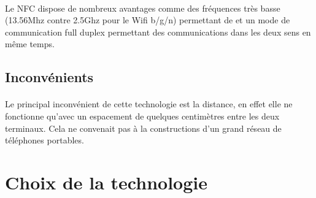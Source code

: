 \documentclass[a4paper,10pt]{report}
\begin{document}
    \paragraph{}
    Le NFC dispose de nombreux avantages comme des fréquences très basse (13.56Mhz contre 2.5Ghz pour le Wifi b/g/n) permettant de et un mode de communication full duplex permettant des communications dans les deux sens en même temps.
    \subsection{Inconvénients}
    \paragraph{}
    Le principal inconvénient de cette technologie est la distance, en effet elle ne fonctionne qu'avec un espacement de quelques centimètres entre les deux terminaux. Cela ne convenait pas à la constructions d'un grand réseau de téléphones portables.
  \section{Choix de la technologie}
  
    
\end{document}
